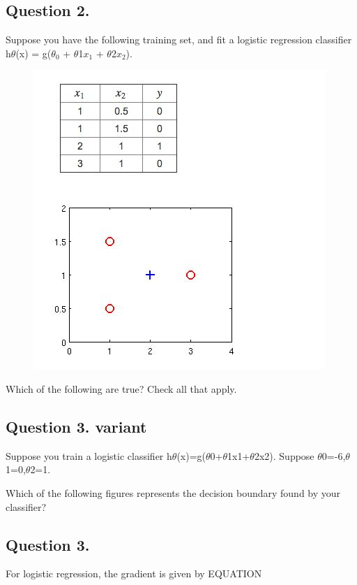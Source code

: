 
	
	\subsection*{Question 2. }
	Suppose you have the following training set, and fit a logistic regression classifier h$\theta$(x) = g($\theta_0$ + $\theta$1$x_1$ + $\theta$2$x_2$).
	
	\begin{figure}[h!]
\centering
\includegraphics[width=0.6\linewidth]{Week3-Quiz-1}

\end{figure}

	
	Which of the following are true? Check all that apply.
	
	\subsection{Question 3. variant
		}
	Suppose you train a logistic classifier h$\theta$(x)=g($\theta$0+$\theta$1x1+$\theta$2x2). 
	Suppose $\theta$0=-6,$\theta$1=0,$\theta$2=1. 
	
	Which of the following figures represents the decision boundary found by your classifier?
	
	\subsection*{Question 3. }
	For logistic regression, the gradient is given by EQUATION
	
